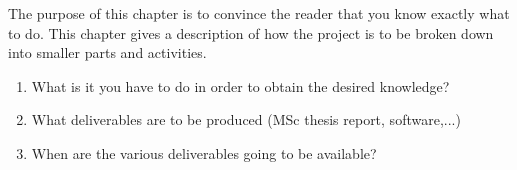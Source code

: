 \documentclass[informationsecurity]{gucmasterproject}
\begin{document}
%           



The purpose of this chapter is to convince the reader that you know exactly what to do.
This chapter gives a description of how the project is to be
broken down into smaller parts and activities.
\begin{enumerate}
\item  What is it you have to do in order to obtain the desired knowledge?
\item  What deliverables are to be produced (MSc thesis report, software,...)
\item  When are the various deliverables going to be available?
\end{enumerate}
\end{document}
